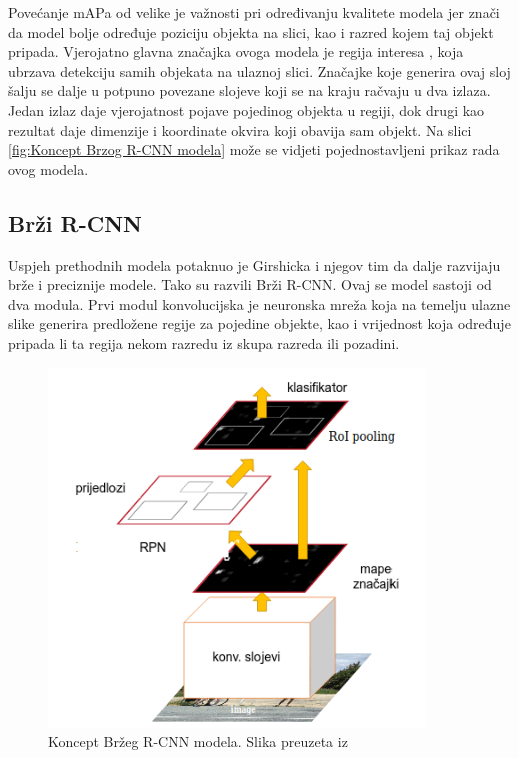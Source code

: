 Povećanje mAPa od velike je važnosti pri određivanju kvalitete modela jer znači da model bolje određuje poziciju objekta na slici, kao i razred kojem taj objekt 
pripada.\newline
Vjerojatno glavna značajka ovoga modela je regija interesa , koja ubrzava
detekciju samih objekata na ulaznoj slici. 
Značajke koje generira ovaj sloj šalju se dalje u potpuno povezane slojeve  koji 
se na kraju račvaju u dva izlaza. Jedan izlaz daje vjerojatnost pojave pojedinog objekta u regiji, dok 
drugi kao rezultat daje dimenzije i koordinate okvira koji obavija sam objekt. Na slici \ref{fig:Koncept Brzog R-CNN modela} može se
vidjeti pojednostavljeni prikaz rada ovog modela. \cite{DBLP:journals/corr/Girshick15}


\subsection{Brži R-CNN}
Uspjeh prethodnih modela potaknuo je Girshicka i njegov tim da dalje razvijaju brže i preciznije modele.
Tako su razvili Brži R-CNN. Ovaj se model sastoji od dva modula.\newline
Prvi modul konvolucijska je neuronska mreža koja na temelju ulazne slike generira predložene regije za pojedine objekte, kao i vrijednost koja određuje pripada li ta regija
nekom razredu iz skupa razreda ili pozadini.

\begin{figure}[htb]
    \centering
    \includegraphics[width=10cm]{img/Faster-RCNN.png}
    \caption{Koncept Bržeg R-CNN modela. Slika preuzeta iz \citep{DBLP:journals/corr/RenHG015}}
    \label{fig:Koncept Bržeg R-CNN modela}
\end{figure}

